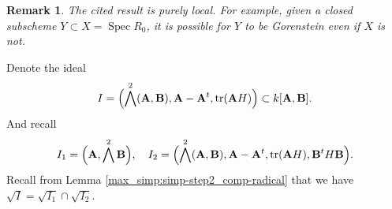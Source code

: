 \documentclass[pdflatex,sn-mathphys-num]{sn-jnl}%
\theoremstyle{thmstyleone}%
\theoremstyle{thmstyletwo}%
\newtheorem{remark}[subsubsection]{Remark}%
\numberwithin{equation}{subsection}
\theoremstyle{thmstylethree}%
\newcommand{\bA}{\ensuremath{\mathbf{A}}\xspace}
\newcommand{\bB}{\ensuremath{\mathbf{B}}\xspace}
\DeclareMathOperator{\Spec}{Spec}
\DeclareMathOperator{\tr}{tr}
\begin{document}
\begin{remark}\label{max_red:non-gorenstein}
The cited result \cite[\href{https://stacks.math.columbia.edu/tag/0BJJ}{0BJJ}]{Stacks} is purely local. For example, given a closed subscheme $Y\subset X=\Spec R_0$, it is possible for $Y$ to be Gorenstein even if $X$ is not.
\end{remark}


Denote the ideal
\begin{equation*}
		I=\Bigl(\bigwedge^2 (\bA,\bB), \bA-\bA^t,\tr(\bA H)\Bigr)\subset k[\bA,\bB].
	\end{equation*}
And recall
\begin{equation*}
    I_1=\Bigl(\bA,\bigwedge^2\bB\Bigr),
	\quad
	I_2=\Bigl(\bigwedge^2(\bA,\bB),\bA-\bA^t,\tr(\bA H),\bB^tH\bB\Bigr).
\end{equation*}
Recall from Lemma \ref{max_simp:simp-step2_comp-radical} that we have $\sqrt{I}=\sqrt{I_1}\cap\sqrt{I_2}$.
\end{document}
